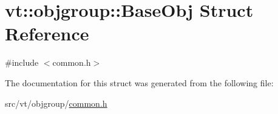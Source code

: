 \hypertarget{structvt_1_1objgroup_1_1_base_obj}{}\section{vt\+:\+:objgroup\+:\+:Base\+Obj Struct Reference}
\label{structvt_1_1objgroup_1_1_base_obj}


{\ttfamily \#include $<$common.\+h$>$}



The documentation for this struct was generated from the following file\+:\begin{DoxyCompactItemize}
\item 
src/vt/objgroup/\hyperlink{src_2vt_2objgroup_2common_8h}{common.\+h}\end{DoxyCompactItemize}
